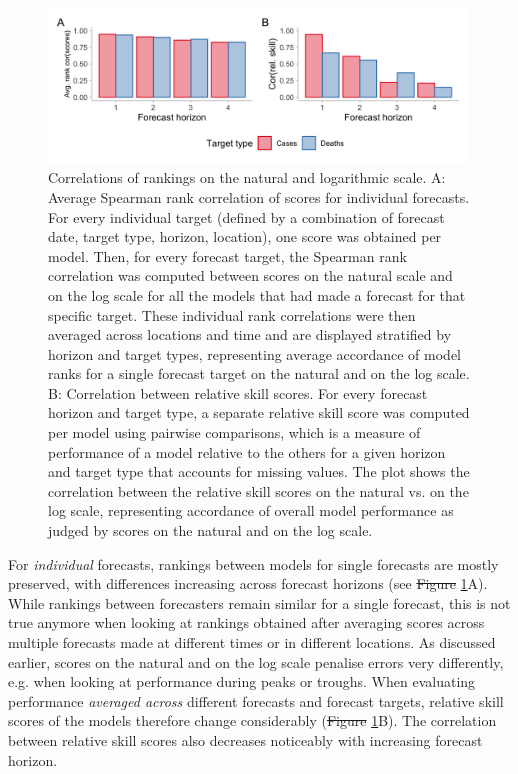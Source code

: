 \documentclass[10pt,letterpaper]{article} %
\providecommand{\DIFaddtex}[1]{{\protect\color{blue}\uwave{#1}}} %
\providecommand{\DIFdeltex}[1]{{\protect\color{red}\sout{#1}}}                      %
\providecommand{\DIFaddbegin}{} %
\providecommand{\DIFaddend}{} %
\providecommand{\DIFdelbegin}{} %
\providecommand{\DIFdelend}{} %
\providecommand{\DIFadd}[1]{\texorpdfstring{\DIFaddtex{#1}}{#1}} %
\providecommand{\DIFdel}[1]{\texorpdfstring{\DIFdeltex{#1}}{}} %
\newcommand{\DIFscaledelfig}{0.5}
\newlength{\DIFdelgraphicswidth} %
\newlength{\DIFdelgraphicsheight} %
\newcommand{\DIFaddincludegraphics}[2][]{{\color{blue}\fbox{\DIFOincludegraphics[#1]{#2}}}} %
\newcommand{\DIFdelincludegraphics}[2][]{%
\sbox{\DIFdelgraphicsbox}{\DIFOincludegraphics[#1]{#2}}%
\settoboxwidth{\DIFdelgraphicswidth}{\DIFdelgraphicsbox} %
\settoboxtotalheight{\DIFdelgraphicsheight}{\DIFdelgraphicsbox} %
\scalebox{\DIFscaledelfig}{%
\parbox[b]{\DIFdelgraphicswidth}{\usebox{\DIFdelgraphicsbox}\\[-\baselineskip] \rule{\DIFdelgraphicswidth}{0em}}\llap{\resizebox{\DIFdelgraphicswidth}{\DIFdelgraphicsheight}{%
\setlength{\unitlength}{\DIFdelgraphicswidth}%
\begin{picture}(1,1)%
\thicklines\linethickness{2pt} %
{\color[rgb]{1,0,0}\put(0,0){\framebox(1,1){}}}%
{\color[rgb]{1,0,0}\put(0,0){\line( 1,1){1}}}%
{\color[rgb]{1,0,0}\put(0,1){\line(1,-1){1}}}%
\end{picture}%
}\hspace*{3pt}}} %
} %
\DeclareRobustCommand{\DIFaddbegin}{\DIFOaddbegin \let\includegraphics\DIFaddincludegraphics} %
\DeclareRobustCommand{\DIFaddend}{\DIFOaddend \let\includegraphics\DIFOincludegraphics} %
\DeclareRobustCommand{\DIFdelbegin}{\DIFOdelbegin \let\includegraphics\DIFdelincludegraphics} %
\DeclareRobustCommand{\DIFdelend}{\DIFOaddend \let\includegraphics\DIFOincludegraphics} %
\begin{document}
\begin{figure}[h!]
    \centering
    \includegraphics[width=0.99\textwidth]{../output/figures/HUB-correlations.png}
    \caption{Correlations of rankings on the natural and logarithmic scale. A: Average Spearman rank correlation of scores for individual forecasts. For every individual target (defined by a combination of forecast date, target type, horizon, location), one score was obtained per model. Then, for every forecast target, the Spearman rank correlation was computed between scores on the natural scale and on the log scale for all the models that had made a forecast for that specific target. These individual rank correlations were then averaged across locations and time and are displayed stratified by horizon and target types, representing average accordance of model ranks for a single forecast target on the natural and on the log scale. B: Correlation between relative skill scores. For every forecast horizon and target type, a separate relative skill score was computed per model using pairwise comparisons, which is a measure of performance of a model relative to the others for a given horizon and target type that accounts for missing values. The plot shows the correlation between the relative skill scores on the natural vs. on the log scale, representing accordance of overall model performance as judged by scores on the natural and on the log scale.}
    \label{fig:HUB-cors}
\end{figure}

For \textit{individual} forecasts, rankings between models for single forecasts are mostly preserved, with differences increasing across forecast horizons (see \DIFdelbegin \DIFdel{Figure }\DIFdelend \DIFaddbegin \DIFadd{Fig }\DIFaddend \ref{fig:HUB-cors}A). While rankings between forecasters remain similar for a single forecast, this is not true anymore when looking at rankings obtained after averaging scores across multiple forecasts made at different times or in different locations. As discussed earlier, scores on the natural and on the log scale penalise errors very differently, e.g. when looking at performance during peaks or troughs. When evaluating performance \textit{averaged across} different forecasts and forecast targets, relative skill scores of the models therefore change considerably (\DIFdelbegin \DIFdel{Figure }\DIFdelend \DIFaddbegin \DIFadd{Fig }\DIFaddend \ref{fig:HUB-cors}B). The correlation between relative skill scores also decreases noticeably with increasing forecast horizon. 
\end{document}

